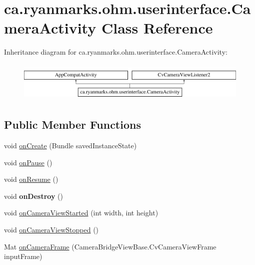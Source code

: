 \hypertarget{classca_1_1ryanmarks_1_1ohm_1_1userinterface_1_1_camera_activity}{}\section{ca.\+ryanmarks.\+ohm.\+userinterface.\+Camera\+Activity Class Reference}
\label{classca_1_1ryanmarks_1_1ohm_1_1userinterface_1_1_camera_activity}
Inheritance diagram for ca.\+ryanmarks.\+ohm.\+userinterface.\+Camera\+Activity\+:\begin{figure}[H]
\begin{center}
\leavevmode
\includegraphics[height=1.911263cm]{classca_1_1ryanmarks_1_1ohm_1_1userinterface_1_1_camera_activity}
\end{center}
\end{figure}
\subsection*{Public Member Functions}
\begin{DoxyCompactItemize}
\item 
void \hyperlink{classca_1_1ryanmarks_1_1ohm_1_1userinterface_1_1_camera_activity_afa73d36e5322e895558c6663acb190bf}{on\+Create} (Bundle saved\+Instance\+State)
\item 
void \hyperlink{classca_1_1ryanmarks_1_1ohm_1_1userinterface_1_1_camera_activity_a34efe943c0d3769ad9b9f9866974836f}{on\+Pause} ()
\item 
void \hyperlink{classca_1_1ryanmarks_1_1ohm_1_1userinterface_1_1_camera_activity_a9178d308984ee4f944f051adc205373d}{on\+Resume} ()
\item 
\hypertarget{classca_1_1ryanmarks_1_1ohm_1_1userinterface_1_1_camera_activity_ada3e30d69cbb69ed1f34827cf20ca17d}{}\label{classca_1_1ryanmarks_1_1ohm_1_1userinterface_1_1_camera_activity_ada3e30d69cbb69ed1f34827cf20ca17d} 
void {\bfseries on\+Destroy} ()
\item 
void \hyperlink{classca_1_1ryanmarks_1_1ohm_1_1userinterface_1_1_camera_activity_a57e9b0251cfc888e8514a45f88bec4a4}{on\+Camera\+View\+Started} (int width, int height)
\item 
void \hyperlink{classca_1_1ryanmarks_1_1ohm_1_1userinterface_1_1_camera_activity_a33cb29ef55f85b3459231b01d15db6c3}{on\+Camera\+View\+Stopped} ()
\item 
Mat \hyperlink{classca_1_1ryanmarks_1_1ohm_1_1userinterface_1_1_camera_activity_a91c2f08d2f0fa30ee24c1c8420d0b420}{on\+Camera\+Frame} (Camera\+Bridge\+View\+Base.\+Cv\+Camera\+View\+Frame input\+Frame)
\end{DoxyCompactItemize}


